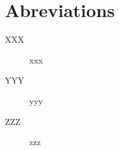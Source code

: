 \chapter*{Abreviations}

\begin{multicols}{2}

\begin{description}
\item[XXX]xxx
\item[YYY]yyy
\item[ZZZ]zzz
\end{description}

\end{multicols}

